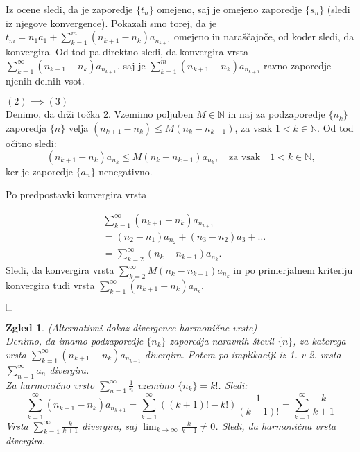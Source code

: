 \documentclass[a4paper,12pt]{article}
\def\N{\mathbb{N}} %
\def\qed{$\hfill\Box$}   %
\newtheorem{zgled}{Zgled}
\begin{document}
Iz ocene sledi, da je zaporedje $\{t_n\}$ omejeno, saj je omejeno zaporedje $\{s_n\}$ (sledi iz njegove konvergence).
Pokazali smo torej, da je $t_m  = n_1a_1 + \sum_{k = 1}^{m}{(n_{k+1} - n_k)a_{n_{k + 1}}}$ omejeno in naraščajoče, od koder sledi, da konvergira.
Od tod pa direktno sledi, da konvergira vrsta $\sum_{k = 1}^{\infty}{(n_{k+1} - n_k)a_{n_{k + 1}}}$, saj je 
$\sum_{k = 1}^{m}{(n_{k+1} - n_k)a_{n_{k + 1}}}$ ravno zaporedje njenih delnih vsot.

\noindent
$(2) \implies (3)$\\
Denimo, da drži točka 2.
Vzemimo poljuben $M \in \N$ in naj za podzaporedje $\{n_k\}$ zaporedja $\{n\}$ velja
$ (n_{k+1} - n_k) \leq M(n_k - n_{k - 1})$, za vsak $ 1 < k \in \N$.
Od tod očitno sledi:
\[
    (n_{k+1} - n_k)a_{n_k} \leq M(n_k - n_{k - 1})a_{n_k}, \quad \text{za vsak} \quad  1 < k \in \N \text{,}
\]
ker je zaporedje $\{a_n\}$ nenegativno.

Po predpostavki konvergira vrsta

\[
    \begin{split}
    & \sum_{k = 1}^{\infty}{(n_{k+1} - n_k)a_{n_{k + 1}}}\\
    & = (n_2 -n_1)a_{n_2} + (n_3 - n_2)a_3 + \ldots \\
    & = \sum_{k = 2}^{\infty}{(n_k - n_{k - 1})a_{n_k}} \text{.}
    \end{split}
\]
Sledi, da konvergira vrsta $\sum_{k = 2}^{\infty}{M(n_k - n_{k - 1})a_{n_k}}$ in po 
primerjalnem kriteriju konvergira tudi vrsta $\sum_{k = 1}^{\infty}{(n_{k+1} - n_k)a_{n_{k}}}$.

\qed

\begin{zgled}(Alternativni dokaz divergence harmonične vrste)\\
    Denimo, da imamo podzaporedje $\{n_k\}$ zaporedja naravnih števil $\{n\}$, 
    za katerega vrsta $\sum_{k = 1}^{\infty}{(n_{k+1} - n_k)a_{n_{k + 1}}}$ divergira. Potem po implikaciji
    iz 1. v 2. vrsta $\sum_{n = 1}^{\infty}{a_n}$ divergira.\\
    Za harmonično vrsto $\sum_{n = 1}^{\infty}{\frac{1}{n}}$ vzemimo $\{n_k\} = k!$. Sledi:
    \[
        \sum_{k = 1}^{\infty}{(n_{k+1} - n_k)a_{n_{k + 1}}} =
        \sum_{k = 1}^{\infty}{((k + 1)! - k!) \frac{1}{(k+1)!}}=
        \sum_{k = 1}^{\infty}{\frac{k}{k + 1}}
    \]
    Vrsta $\sum_{k = 1}^{\infty}{\frac{k}{k + 1}}$ divergira,
    saj $\lim_{k \to \infty}{\frac{k}{k + 1}} \neq 0$. Sledi, da harmonična vrsta divergira.
\end{zgled}
\end{document}
